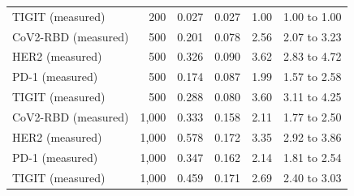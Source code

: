 \documentclass[11pt,a4paper]{article}
\begin{document}
\begin{table}[h]
\begin{tabular}{@{}lrrrrr@{}}
TIGIT (measured) & 200 & 0.027 & 0.027 & 1.00 & 1.00 to 1.00 \\
CoV2-RBD (measured) & 500 & 0.201 & 0.078 & 2.56 & 2.07 to 3.23 \\
HER2 (measured) & 500 & 0.326 & 0.090 & 3.62 & 2.83 to 4.72 \\
PD-1 (measured) & 500 & 0.174 & 0.087 & 1.99 & 1.57 to 2.58 \\
TIGIT (measured) & 500 & 0.288 & 0.080 & 3.60 & 3.11 to 4.25 \\
CoV2-RBD (measured) & 1,000 & 0.333 & 0.158 & 2.11 & 1.77 to 2.50 \\
HER2 (measured) & 1,000 & 0.578 & 0.172 & 3.35 & 2.92 to 3.86 \\
PD-1 (measured) & 1,000 & 0.347 & 0.162 & 2.14 & 1.81 to 2.54 \\
TIGIT (measured) & 1,000 & 0.459 & 0.171 & 2.69 & 2.40 to 3.03 \\
\bottomrule
\end{tabular}
\end{table}
\end{document}
